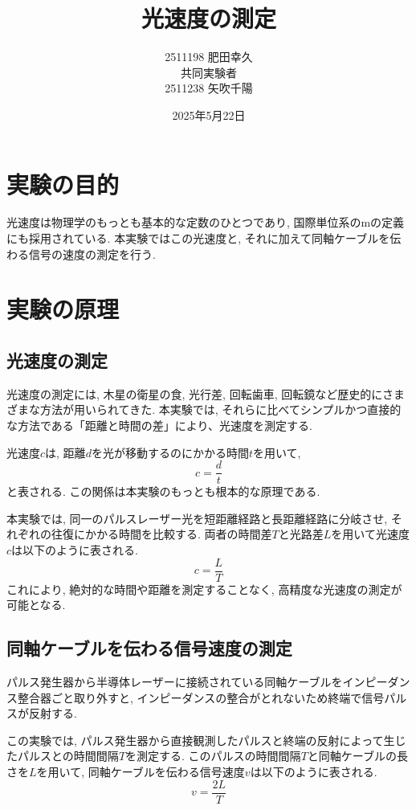 \documentclass{jarticle}
\title{光速度の測定}
\author{2511198 肥田幸久 \\ 共同実験者 \\ 2511238 矢吹千陽}
\date{2025年5月22日}
\begin{document}
\maketitle



\section{実験の目的}
光速度は物理学のもっとも基本的な定数のひとつであり, 国際単位系の$\mathrm{m}$の定義にも採用されている. 本実験ではこの光速度と, それに加えて同軸ケーブルを伝わる信号の速度の測定を行う.



\section{実験の原理}


\subsection{光速度の測定}

光速度の測定には, 木星の衛星の食, 光行差, 回転歯車, 回転鏡など歴史的にさまざまな方法が用いられてきた. 本実験では, それらに比べてシンプルかつ直接的な方法である「距離と時間の差」により、光速度を測定する.

光速度$c$は, 距離$d$を光が移動するのにかかる時間$t$を用いて,
\begin{equation}
  c=\frac{d}{t}
\end{equation}
と表される. この関係は本実験のもっとも根本的な原理である.

本実験では, 同一のパルスレーザー光を短距離経路と長距離経路に分岐させ, それぞれの往復にかかる時間を比較する. 両者の時間差$T$と光路差$L$を用いて光速度$c$は以下のように表される.
\begin{equation}
  c=\frac{L}{T}
\end{equation}
これにより, 絶対的な時間や距離を測定することなく, 高精度な光速度の測定が可能となる.


\subsection{同軸ケーブルを伝わる信号速度の測定}

パルス発生器から半導体レーザーに接続されている同軸ケーブルをインピーダンス整合器ごと取り外すと, インピーダンスの整合がとれないため終端で信号パルスが反射する.

この実験では, パルス発生器から直接観測したパルスと終端の反射によって生じたパルスとの時間間隔$T$を測定する.
このパルスの時間間隔$T$と同軸ケーブルの長さを$L$を用いて, 同軸ケーブルを伝わる信号速度$v$は以下のように表される.
\begin{equation}
  v=\frac{2L}{T}
\end{equation}
\end{document}
